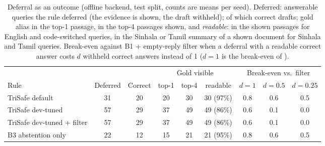 \begin{table}[t]
  \caption{Deferral as an outcome (offline backend, test split, counts are means per seed). Deferred: answerable queries the rule deferred (the evidence is shown, the draft withheld); of which correct drafts; gold alias in the top-1 passage, in the top-4 passages shown, and \emph{readable}: in the shown passages for English and code-switched queries, in the Sinhala or Tamil summary of a shown document for Sinhala and Tamil queries. Break-even against B1 + empty-reply filter when a deferral with a readable correct answer costs $d$ withheld correct answers instead of 1 ($d{=}1$ is the break-even of \CostRef).}
  \label{tab:defer-offline}
  \scriptsize
  \setlength{\tabcolsep}{2pt}
  \begin{tabular}{@{}lcccccccc@{}}
    \toprule
    & & & \multicolumn{3}{c}{Gold visible} & \multicolumn{3}{c}{Break-even vs.\ filter} \\
    \cmidrule(lr){4-6} \cmidrule(lr){7-9}
    Rule & Deferred & Correct & top-1 & top-4 & readable & $d{=}1$ & $d{=}0.5$ & $d{=}0.25$ \\
    \midrule
    TriSafe default & 31 & 20 & 20 & 30 & 30 (97\%) & 0.8 & 0.6 & 0.5 \\
    TriSafe dev-tuned & 57 & 29 & 37 & 49 & 49 (86\%) & 0.6 & 0.1 & 0.0 \\
    TriSafe dev-tuned + filter & 57 & 29 & 37 & 49 & 49 (86\%) & 0.6 & 0.1 & 0.0 \\
    B3 abstention only & 22 & 12 & 15 & 21 & 21 (95\%) & 0.8 & 0.6 & 0.5 \\
    \bottomrule
  \end{tabular}
\end{table}

